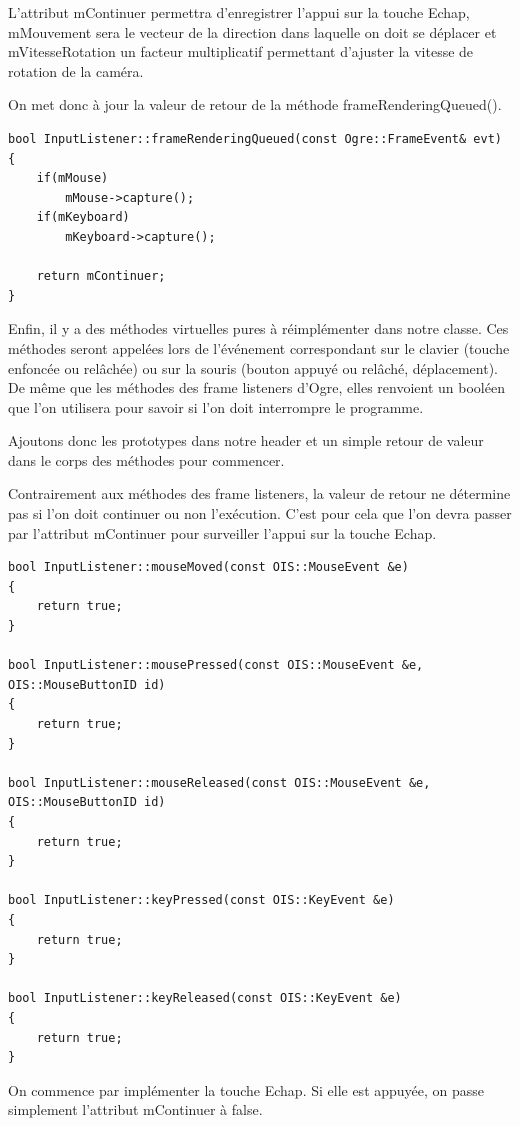 \documentclass[10pt,a4paper]{report}
\begin{document}
L'attribut mContinuer permettra d'enregistrer l'appui sur la touche Echap, mMouvement sera le vecteur de la direction dans laquelle on doit se d\'eplacer et mVitesseRotation un facteur multiplicatif permettant d'ajuster la vitesse de rotation de la cam\'era.

On met donc \`a jour la valeur de retour de la m\'ethode frameRenderingQueued().

\begin{lstlisting}[caption={}]
bool InputListener::frameRenderingQueued(const Ogre::FrameEvent& evt)
{
    if(mMouse)
        mMouse->capture();
    if(mKeyboard)
        mKeyboard->capture();

    return mContinuer;
}
\end{lstlisting}

Enfin, il y a des m\'ethodes virtuelles pures \`a r\'eimpl\'ementer dans notre classe. Ces m\'ethodes seront appel\'ees lors de l'\'ev\'enement correspondant sur le clavier (touche enfonc\'ee ou rel\^ach\'ee) ou sur la souris (bouton appuy\'e ou rel\^ach\'e, d\'eplacement). De m\^eme que les m\'ethodes des frame listeners d'Ogre, elles renvoient un bool\'een que l'on utilisera pour savoir si l'on doit interrompre le programme.

Ajoutons donc les prototypes dans notre header et un simple retour de valeur dans le corps des m\'ethodes pour commencer.

Contrairement aux m\'ethodes des frame listeners, la valeur de retour ne d\'etermine pas si l'on doit continuer ou non l'ex\'ecution. C'est pour cela que l'on devra passer par l'attribut mContinuer pour surveiller l'appui sur la touche Echap.


\begin{lstlisting}[caption={M\'ethodes virtuelles appel\'ees lors d'un \'ev\`enement sur un p\'eriph\'erique}]
bool InputListener::mouseMoved(const OIS::MouseEvent &e)
{
    return true;
}

bool InputListener::mousePressed(const OIS::MouseEvent &e, OIS::MouseButtonID id)
{
    return true;
}

bool InputListener::mouseReleased(const OIS::MouseEvent &e, OIS::MouseButtonID id)
{
    return true;
}

bool InputListener::keyPressed(const OIS::KeyEvent &e)
{
    return true;
}

bool InputListener::keyReleased(const OIS::KeyEvent &e)
{
    return true;
}
\end{lstlisting}

On commence par impl\'ementer la touche Echap. Si elle est appuy\'ee, on passe simplement l'attribut mContinuer \`a false.
\end{document}
